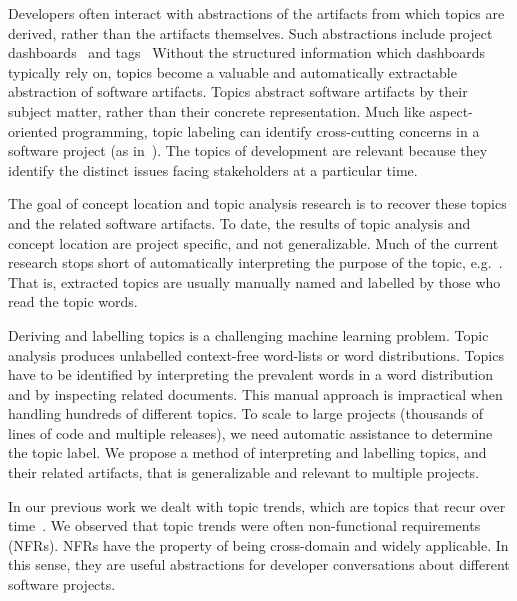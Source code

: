 \documentclass[]{sig-alternate}
\begin{document}
Developers often interact with abstractions of the artifacts from which topics are derived, rather than the artifacts themselves.
Such abstractions include project dashboards~\cite{kersten2005mylar} and tags~\cite{treude2010}%
Without the structured information which dashboards typically rely on, topics become a valuable and automatically extractable abstraction of software artifacts.
Topics abstract software artifacts by their subject matter, rather than their concrete representation. 
Much like aspect-oriented programming, topic labeling can identify cross-cutting concerns in a software project (as in~\cite{Baldi2008}).
The topics of development are relevant because they identify the distinct issues facing stakeholders at a particular time.

The goal of concept location and topic analysis research is to recover these topics and the related software artifacts.
To date, the results of topic analysis and concept location are project specific, and not generalizable.
Much of the current research stops short of automatically interpreting the purpose of the topic, e.g.~\cite{Baldi2008,Kuhn2007,marcus04wcre}. 
That is, extracted topics are usually manually named and labelled by those who read the topic words.

Deriving and labelling topics is a challenging machine learning problem. 
Topic analysis produces %
 unlabelled context-free word-lists or word distributions.
Topics have to be identified by interpreting the prevalent words in a word distribution and by inspecting related documents. 
This manual approach is impractical when handling hundreds of different topics. To scale to large projects (thousands of lines of code and multiple releases), we need automatic assistance to determine the topic label.
We propose a method of interpreting and labelling topics, and their related artifacts, that is generalizable and relevant to multiple projects.

In our previous work we dealt with topic trends, which are topics that recur over time~\cite{Hindle09ICSM}. 
We observed that topic trends were often non-functional requirements (NFRs). 
NFRs have the property of being cross-domain and widely applicable. 
In this sense, they are useful abstractions for developer conversations about different software projects.
\end{document}
